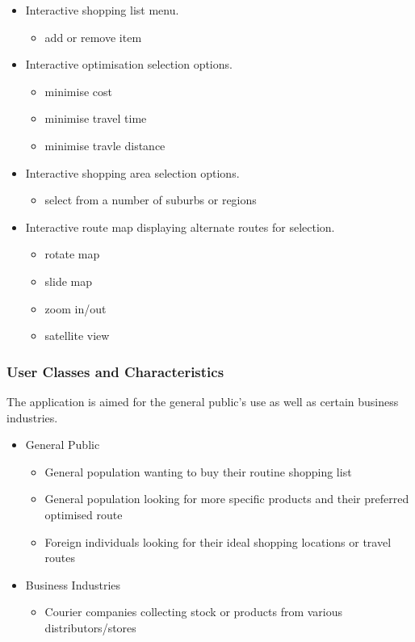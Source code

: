 \documentclass[10pt,twocolumn]{witseiepaper}
\begin{document}
		\begin{itemize}
			\item Interactive shopping list menu.
			\begin{itemize}
				\item add or remove item
			\end{itemize}
			\item Interactive optimisation selection options.
			\begin{itemize}
				\item minimise cost
				\item minimise travel time
				\item minimise travle distance
			\end{itemize}
			\item Interactive shopping area selection options.
			\begin{itemize}
				\item select from a number of suburbs or regions
			\end{itemize}
			\item Interactive route map displaying alternate routes for selection.
			\begin{itemize}
				\item rotate map
				\item slide map
				\item zoom in/out
				\item satellite view
			\end{itemize}
		\end{itemize}
		
		\subsubsection{User Classes and Characteristics}
		
		The application is aimed for the general public's use as well as certain business industries. 
		
		\begin{itemize}
			\item General Public
			\begin{itemize}
				\item General population wanting to buy their routine shopping list
				\item General population looking for more specific products and their preferred optimised route
				\item Foreign individuals looking for their ideal shopping locations or travel routes
			\end{itemize}
			\item Business Industries
			\begin{itemize}
				\item Courier companies collecting stock or products from various distributors/stores
			\end{itemize}
		\end{itemize}
		
\end{document}
